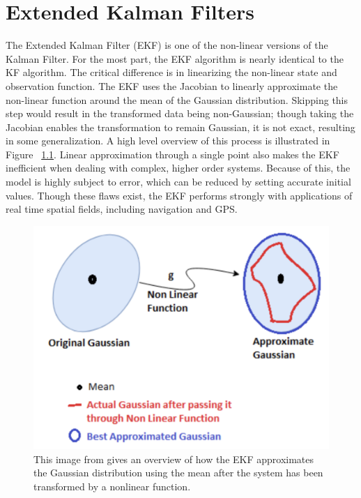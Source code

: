 \chapter{Extended Kalman Filters}
\label{Extended Kalman Filters}

The Extended Kalman Filter (EKF) is one of the non-linear versions of the Kalman Filter. For the most part, the EKF algorithm is nearly identical to the KF algorithm. The critical difference is in linearizing the non-linear state and observation function. The EKF uses the Jacobian to linearly approximate the non-linear function around the mean of the Gaussian distribution. Skipping this step would result in the transformed data being non-Gaussian; though taking the Jacobian enables the transformation to remain Gaussian, it is not exact, resulting in some generalization. A high level overview of this process is illustrated in Figure ~\ref{fig:EKF}. Linear approximation through a single point also makes the EKF inefficient when dealing with complex, higher order systems. Because of this, the model is highly subject to error, which can be reduced by setting accurate initial values. Though these flaws exist, the EKF performs strongly with applications of real time spatial fields, including navigation and GPS.  \\

 \begin{figure}[ht]
    \centering
    \includegraphics[scale = 0.35]{EKF.png}
    \caption{This image from \cite{chadha_2019} gives an overview of how the EKF approximates the Gaussian distribution using the mean after the system has been transformed by a nonlinear function.}
    \label{fig:EKF}
    \end{figure}
    
